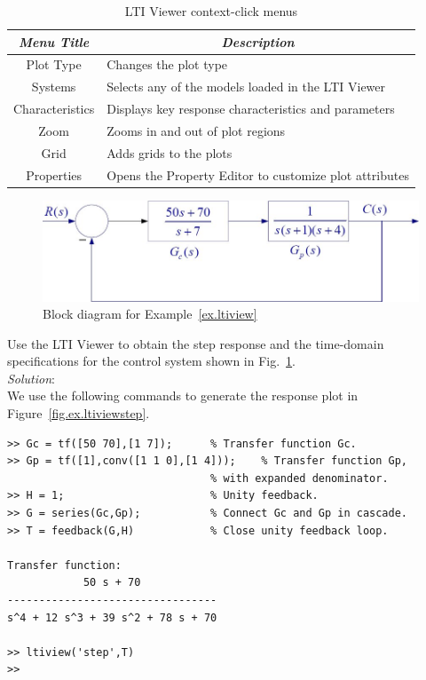 \begin{table}[bht]
\centering
\renewcommand{\arraystretch}{1.2}
\begin{tabular}{c|p{}}
    \textit{Menu Title}& \multicolumn{1}{c}{\textit{Description}}\\ \hline \hline
    Plot Type       &   Changes the plot type \\
    Systems         &   Selects any of the models loaded in the LTI Viewer \\
    Characteristics &   Displays key response characteristics and parameters\\
    Zoom            &   Zooms in and out of plot regions \\
    Grid            &   Adds grids to the plots \\
    Properties      &   Opens the Property Editor to customize plot attributes
\end{tabular}
\caption{\footnotesize
        LTI Viewer context-click menus
        \label{tab.ltiview}
        }
\end{table}

\begin{figure}[thb]
\centering
\includegraphics[width=.7\textwidth]{ltiviewexample}
\caption{ \footnotesize
        Block diagram for Example~\ref{ex.ltiview}
        \label{fig.ex.ltiview}
        }
\end{figure}

\begin{workex}  \label{ex.ltiview}
Use the LTI Viewer to obtain the step response and the time-domain specifications for the control system shown in Fig.\ \ref{fig.ex.ltiview}.\\
\textit{Solution}:\\
We use the following commands to generate the response plot in Figure~\ref{fig.ex.ltiviewstep}.
\begin{verbatim}
>> Gc = tf([50 70],[1 7]);      % Transfer function Gc.
>> Gp = tf([1],conv([1 1 0],[1 4]));    % Transfer function Gp,
                                % with expanded denominator.
>> H = 1;                       % Unity feedback.
>> G = series(Gc,Gp);           % Connect Gc and Gp in cascade.
>> T = feedback(G,H)            % Close unity feedback loop.

Transfer function:
            50 s + 70
---------------------------------
s^4 + 12 s^3 + 39 s^2 + 78 s + 70

>> ltiview('step',T)
>>
\end{verbatim}
\end{workex}

